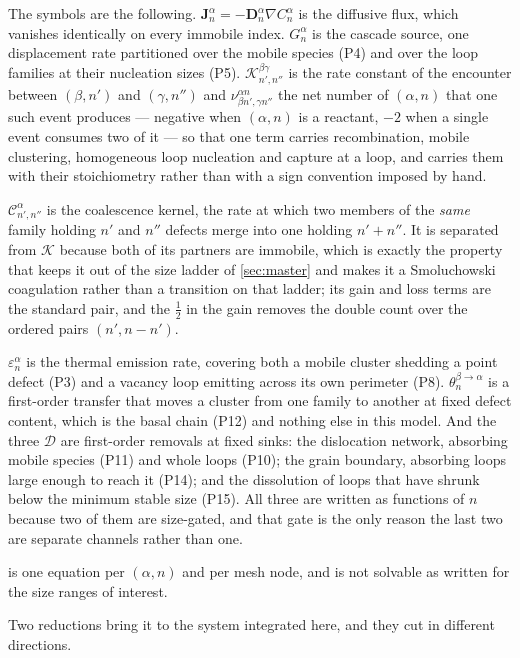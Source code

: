 The symbols are the following. $\bm J^{\alpha}_{n}=-\bm D^{\alpha}_{n}\nabla
C^{\alpha}_{n}$ is the diffusive flux, which vanishes identically on every
immobile index. $G^{\alpha}_{n}$ is the cascade source, one displacement rate
partitioned over the mobile species (P4) and over the loop families at their
nucleation sizes (P5). $\mathcal K^{\beta\gamma}_{n',n''}$ is the rate constant
of the encounter between $(\beta,n')$ and $(\gamma,n'')$ and
$\nu^{\alpha n}_{\beta n',\gamma n''}$ the net number of $(\alpha,n)$ that one
such event produces --- negative when $(\alpha,n)$ is a reactant, $-2$ when a
single event consumes two of it --- so that one term carries recombination,
mobile clustering, homogeneous loop nucleation and capture at a loop, and
carries them with their stoichiometry rather than with a sign convention
imposed by hand.

$\mathcal C^{\alpha}_{n',n''}$ is the coalescence kernel, the rate at which two
members of the \emph{same} family holding $n'$ and $n''$ defects merge into one
holding $n'+n''$. It is separated from $\mathcal K$ because both of its partners
are immobile, which is exactly the property that keeps it out of the size ladder
of \cref{sec:master} and makes it a Smoluchowski coagulation rather than a
transition on that ladder; its gain and loss terms are the standard pair, and
the $\tfrac12$ in the gain removes the double count over the ordered pairs
$(n',n-n')$.

$\varepsilon^{\alpha}_{n}$ is the thermal emission rate, covering both a mobile
cluster shedding a point defect (P3) and a vacancy loop emitting across its own
perimeter (P8). $\theta^{\beta\to\alpha}_{n}$ is a first-order transfer that
moves a cluster from one family to another at fixed defect content, which is the
basal chain (P12) and nothing else in this model. And the three $\mathcal D$
are first-order removals at fixed sinks: the dislocation network, absorbing
mobile species (P11) and whole loops (P10); the grain boundary, absorbing loops
large enough to reach it (P14); and the dissolution of loops that have shrunk
below the minimum stable size (P15). All three are written as functions of $n$
because two of them are size-gated, and that gate is the only reason the last
two are separate channels rather than one.

 is one equation per $(\alpha,n)$ and per mesh node, and is not
solvable as written for the size ranges of interest.

Two reductions bring it to the system integrated here, and they cut in different
directions.

